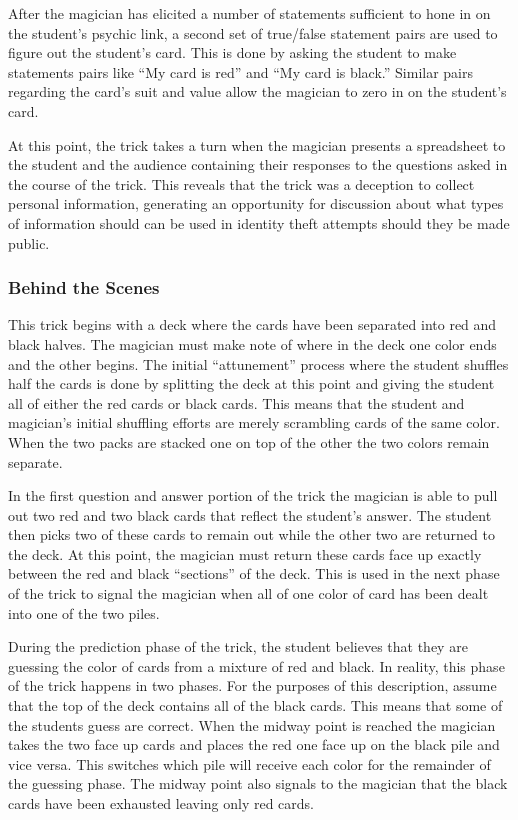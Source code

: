 After the magician has elicited a number of statements sufficient to hone in on
the student's psychic link, a second set of true/false statement pairs are used
to figure out the student's card.  This is done by asking the student to make
statements pairs like ``My card is red'' and ``My card is black.''  Similar
pairs regarding the card's suit and value allow the magician to zero
in on the student's card.

At this point, the trick takes a turn when the magician presents a spreadsheet
to the student and the audience containing their responses to the questions
asked in the course of the trick. This reveals that the trick
was a deception to
collect personal information, generating an opportunity for discussion about what
types of information should can be used in identity theft attempts should they
be made public.


\subsubsection{Behind the Scenes}

This trick begins with a deck where the cards have
been separated into red and black halves.
The magician must make note of where in the deck
one color ends and the other begins.  The initial ``attunement'' process where
the student shuffles half the cards is done by splitting the deck at this point
and giving the student all of either the red cards or black cards.  This means
that the student and magician's initial shuffling efforts are merely scrambling
cards of the same color.
When the two packs are stacked one on top of the other the two colors remain
separate.

In the first question and answer portion of the trick the magician is able to
pull out two red and two black cards that reflect the student's answer.  The
student then picks two of these cards to remain out while the other two are
returned to the deck.  At this point, the magician must return these cards face
up exactly between the red and black ``sections'' of the deck.  This is used in
the next phase of the trick to signal the magician when all of one color of card
has been dealt into one of the two piles.

During the prediction phase of the trick, the student believes that they are
guessing the color of cards from a mixture of red and black.  In reality, this
phase of the trick happens in two phases.
For the purposes of this description,
assume that the top of the deck
contains all of the black cards.
This means that some of the students
guess are correct.
When the midway point is reached the magician takes the two face up cards and places the
red one face up on the black pile and vice versa.  This switches which pile will
receive each color for the remainder of the guessing phase.  The midway point
also signals to the magician that the black cards have been
exhausted leaving only red cards.

